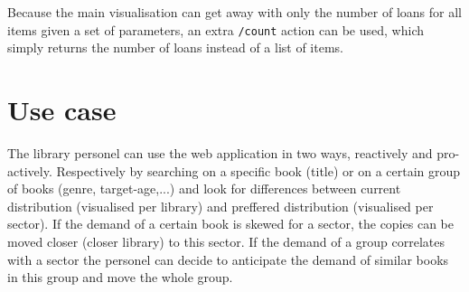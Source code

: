Because the main visualisation can get away with only the number of loans for all items given a set of parameters, an extra \texttt{/count} action can be used, which simply returns the number of loans instead of a list of items.

\section{Use case}

The library personel can use the web application in two ways, reactively and pro-actively. Respectively by searching on a specific book (title) or on a certain group of books (genre, target-age,...) and look for differences between current distribution (visualised per library) and preffered distribution (visualised per sector). If the demand of a certain book is skewed for a sector, the copies can be moved closer (closer library) to this sector. If the demand of a group correlates with a sector the personel can decide to anticipate the demand of similar books in this group and move the whole group.
